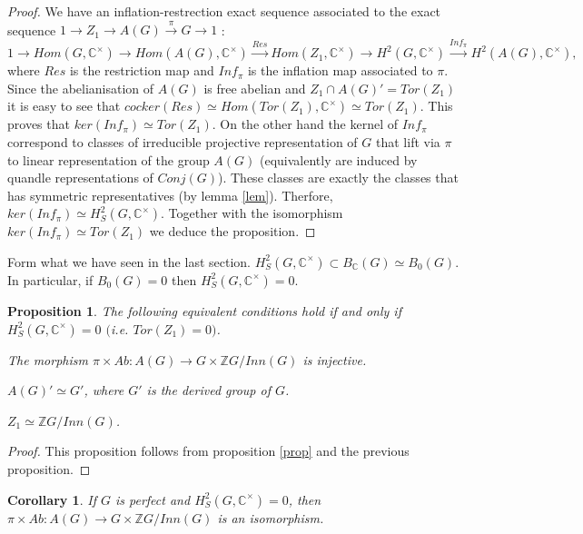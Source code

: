 \documentclass[12pt, reqno]{amsart}
\newtheorem{proposition}[theorem]{Proposition}
\newtheorem{corollary}[theorem]{Corollary}
\begin{document}
\begin{proof}
We have an inflation-restrection exact sequence associated to the exact sequence $1\to Z_1\to A(G) \overset{\pi}{\to} G \to 1$ : 
$$1 \to  Hom(G,\mathbb{C}^\times)\to Hom(A(G),\mathbb{C}^\times)\overset{Res}{\to} Hom(Z_1,\mathbb{C}^\times)\to H^2(G,\mathbb{C}^\times)\overset{Inf_\pi}{\to}H^2(A(G),\mathbb{C}^\times),$$
where $Res$ is the restriction map and $Inf_\pi$ is the inflation map associated to $\pi$. Since the abelianisation of $A(G)$ is free abelian and $Z_1\cap A(G)'=Tor(Z_1)$ it is easy to see that $cocker(Res)\simeq Hom(Tor(Z_1),\mathbb{C}^\times)\simeq Tor(Z_1)$. This proves that $ker(Inf_\pi) \simeq Tor(Z_1)$. On the other hand the kernel of $Inf_\pi$ correspond to classes of irreducible projective representation of $G$ that lift via $\pi$ to linear representation of the group $A(G)$ (equivalently are induced by quandle representations of $Conj(G)$). These classes are exactly the classes that has symmetric representatives (by lemma \ref{lem}). Therfore, $ker(Inf_\pi)\simeq H_S^2(G,\mathbb{C}^\times)$. Together with the isomorphism $ker(Inf_\pi) \simeq Tor(Z_1)$ we deduce the proposition.
\end{proof}
Form what we have seen in the last section. $H_S^2(G,\mathbb{C}^\times)\subset B_\mathbb{C}(G)\simeq B_0(G)$. In particular, if $B_0(G)=0$ then $H_S^2( G,\mathbb{C}^\times)=0$.
\begin{proposition}
The following equivalent conditions hold if and only if $H_S^2(G,\mathbb{C}^\times)=0$ $($i.e. $Tor(Z_1)=0$$)$.
\item[1)] The morphism $\pi \times Ab : A(G) \to G \times \mathbb{Z} G/Inn(G)$ is injective.
\item[2)] $A(G)'\simeq G'$, where $G'$ is the derived group of $G$.
\item[3)] $Z_1 \simeq \mathbb{Z} G/Inn(G)$.
\end{proposition}
\begin{proof}
This proposition follows from proposition \ref{prop} and the previous proposition.
\end{proof}
\begin{corollary}
If $G$ is perfect and $H_S^2(G,\mathbb{C}^\times)=0$, then $\pi \times Ab : A(G) \to G\times \mathbb{Z} G/Inn(G)$ is an isomorphism.
\end{corollary}
\end{document}
